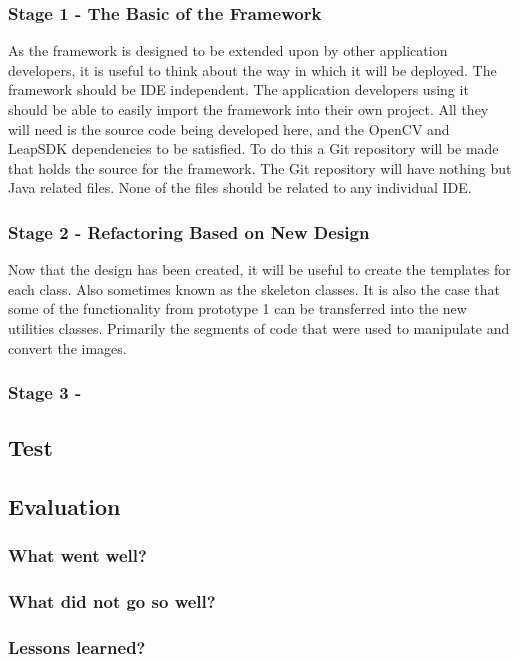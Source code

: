 \documentclass[11pt,oneside]{report}
\begin{document}
		\subsubsection{Stage 1 - The Basic of the Framework}
			As the framework is designed to be extended upon by other application developers, it is useful to think about the way in which it will be deployed.
			The framework should be IDE independent.
			The application developers using it should be able to easily import the framework into their own project.
			All they will need is the source code being developed here, and the OpenCV and LeapSDK dependencies to be satisfied.
			To do this a Git repository will be made that holds the source for the framework.
			The Git repository will have nothing but Java related files.
			None of the files should be related to any individual IDE.
		\subsubsection{Stage 2 - Refactoring Based on New Design}
			Now that the design has been created, it will be useful to create the templates for each class.
			Also sometimes known as the skeleton classes.
			It is also the case that some of the functionality from prototype 1 can be transferred into the new utilities classes.
			Primarily the segments of code that were used to manipulate and convert the images.
		\subsubsection{Stage 3 - }
		\subsection{Test}
		\subsection{Evaluation}
			\subsubsection{What went well?}
			\subsubsection{What did not go so well?}
			\subsubsection{Lessons learned?}
\end{document}
